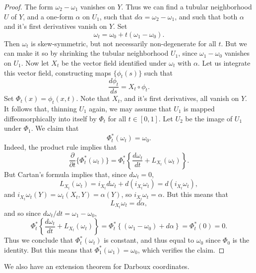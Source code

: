 \begin{proof}
    The form $\omega_2 - \omega_1$ vanishes on $Y$. Thus we can find a tubular neighborhood $U$ of $Y$, and a one-form $\alpha$ on $U_1$, such that $d\alpha = \omega_2 - \omega_1$, and such that both $\alpha$ and it's first derivatives vanish on $Y$. Set
    \[ \omega_t = \omega_0 + t(\omega_1 - \omega_0). \]
    Then $\omega_t$ is skew-symmetric, but not necessarily non-degenerate for all $t$. But we can make it so by shrinking the tubular neighborhood $U_1$, since $\omega_1 - \omega_0$ vanishes on $U_1$. Now let $X_t$ be the vector field identified under $\omega_t$ with $\alpha$. Let us integrate this vector field, constructing maps $\{ \phi_t(s) \}$ such that
    \[ \frac{d\phi_t}{ds} = X_t \circ \phi_t. \]
    Set $\Phi_t(x) = \phi_t(x,t)$. Note that $X_t$, and it's first derivatives, all vanish on $Y$. It follows that, thinning $U_1$ again, we may assume that $U_1$ is mapped diffeomorphically into itself by $\Phi_t$ for all $t \in [0,1]$. Let $U_2$ be the image of $U_1$ under $\Phi_1$. We claim that
    \[ \Phi_t^*(\omega_t) = \omega_0. \]
    Indeed, the product rule implies that
    \[ \frac{\partial}{\partial t} \{ \Phi_t^*(\omega_t) \} = \Phi_t^* \left\{ \frac{d\omega_t}{dt} + L_{X_t}(\omega_t) \right\}. \]
    But Cartan's formula implies that, since $d\omega_t = 0$,
    \[ L_{X_t}(\omega_t) = i_{X_t} d\omega_t + d(i_{X_t} \omega_t) = d(i_{X_t} \omega_t), \]
    and $i_{X_t} \omega_t(Y) = \omega_t(X_t,Y) = \alpha(Y)$, so $i_{X_t} \omega_t = \alpha$. But this means that
    \[ L_{X_t} \omega_t = d \alpha, \]
    and so since $d\omega_t / dt = \omega_1 - \omega_0$,
    \[ \Phi_t^* \left\{ \frac{d\omega_t}{dt} + L_{X_t}(\omega_t) \right\} = \Phi_t^* \left\{ (\omega_1 - \omega_0) + d \alpha \right\} = \Phi_t^*(0) = 0. \]
    Thus we conclude that $\Phi_t^*(\omega_t)$ is constant, and thus equal to $\omega_0$ since $\Phi_0$ is the identity. But this means that $\Phi_1^*(\omega_1) = \omega_0$, which verifies the claim.
\end{proof}

We also have an extension theorem for Darboux coordinates.

